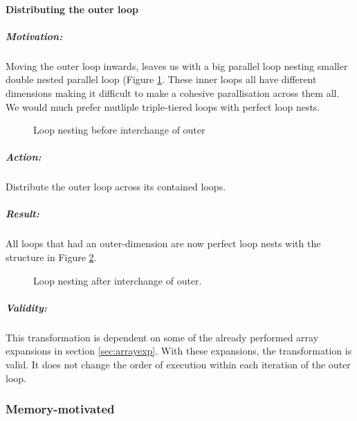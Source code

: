 \paragraph{Distributing the outer loop}
\subparagraph{Motivation:} Moving the outer loop inwards, leaves us with a big parallel loop nesting smaller double nested parallel loop
 (Figure \ref{fig:bintouter}.
 These inner loops all have different dimensions making it difficult to make a cohesive parallisation across them all. We would much
 prefer mutliple triple-tiered loops with perfect loop nests.\\
 \begin{figure}[h!]
   \centering
{}
   \caption{Loop nesting before interchange of outer}
   \label{fig:bintouter}
 \end{figure}
\subparagraph{Action:} Distribute the outer loop across its contained loops.
\subparagraph{Result:} All loops that had an outer-dimension are now perfect loop nests with the structure in Figure \ref{fig:aintouter}.
\begin{figure}[h!]
  \centering
{}
  \caption{Loop nesting after interchange of outer.}
  \label{fig:aintouter}
\end{figure}
\subparagraph{Validity:} This transformation is dependent on some of the already performed array expansions in section \ref{sec:arrayexp}.
 With these expansions, the transformation is valid. It does not change the order of execution within each iteration of the outer loop.
\subsubsection{Memory-motivated}

